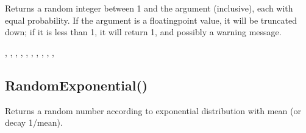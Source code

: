 \documentclass[letterpaper,10pt,english]{sphinxmanual}
\begin{document}
\sphinxAtStartPar
Returns a random integer between 1 and the argument             (inclusive), each with equal probability.  If the argument is           a floating\sphinxhyphen{}point value, it will be truncated down; if it is             less than 1, it will return 1, and possibly a warning message.

\sphinxAtStartPar
{}

\begin{sphinxVerbatim}[commandchars=\\\{\}]
\end{sphinxVerbatim}

\sphinxAtStartPar
{}

\begin{sphinxVerbatim}[commandchars=\\\{\}]
\end{sphinxVerbatim}

\sphinxAtStartPar
{}

\sphinxAtStartPar
{}, , ,            , , ,                , , ,             , 


\subsection{RandomExponential()}
\label{\detokenize{reference/peblmath:randomexponential}}
\sphinxAtStartPar
{}

\sphinxAtStartPar
Returns a random number according to exponential                distribution with mean  (or decay 1/mean).

\sphinxAtStartPar
{}

\begin{sphinxVerbatim}[commandchars=\\\{\}]
\end{sphinxVerbatim}
\end{document}

